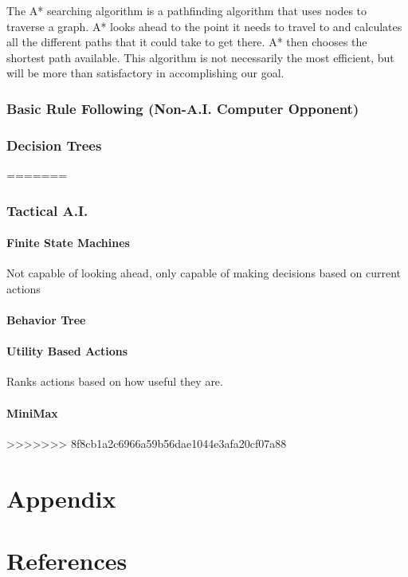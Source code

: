 \documentclass[12pt,a4paper]{report}
\begin{document}
		The A* searching algorithm is a pathfinding algorithm that uses nodes to traverse a graph. A* looks ahead to the point it needs to travel to and calculates all the different paths that it could take to get there. A* then chooses the shortest path available. This algorithm is not necessarily the most efficient, but will be more than satisfactory in accomplishing our goal.
		\subsection{Basic Rule Following (Non-A.I. Computer Opponent)}
		\subsection{Decision Trees}
=======
		\subsection{Tactical A.I.}
		\subsubsection{Finite State Machines}
			Not capable of looking ahead, only capable of making decisions based on current actions
		\subsubsection{Behavior Tree}
		\subsubsection{Utility Based Actions}
			Ranks actions based on how useful they are.
		\subsubsection{MiniMax}
>>>>>>> 8f8cb1a2c6966a59b56dae1044e3afa20cf07a88

\newpage
\chapter*{Appendix}

\newpage
{}
\listoffigures

\newpage
{}
\listoftables

\newpage
\chapter*{References}
	
\end{document}
